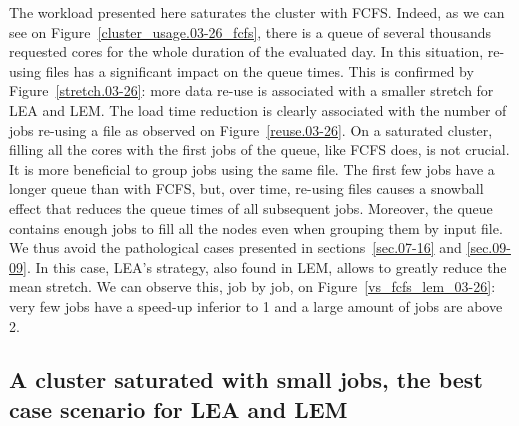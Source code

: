 \documentclass[conference,10pt]{IEEEtran}
\begin{document}
The workload presented here saturates the cluster with FCFS. 
Indeed, as we can see on Figure~\ref{cluster_usage.03-26_fcfs}, there is
a queue of several thousands requested cores
for the whole duration of the evaluated day.
In this situation, re-using files has a significant impact
on the queue times. This is confirmed by Figure~\ref{stretch.03-26}:
more data re-use is associated with a smaller stretch for LEA and LEM.
The load time reduction is clearly associated with the number of jobs re-using a file
as observed on Figure~\ref{reuse.03-26}.
On a saturated cluster, filling all the cores with the first jobs of the queue, like FCFS does, is not crucial.
It is more beneficial to group jobs using the same file.
The first few jobs have a longer queue than with FCFS,
but, over time, re-using files causes a snowball effect that reduces the 
queue times of all subsequent jobs.
Moreover, the queue contains enough jobs to fill all the nodes even when grouping them by input file.
We thus avoid the pathological cases presented in sections~\ref{sec.07-16} and \ref{sec.09-09}.
In this case, LEA's strategy, also found in LEM, allows to greatly reduce the mean stretch.
We can observe this, job by job, on Figure~\ref{vs_fcfs_lem_03-26}: very few jobs 
have a speed-up inferior to 1 and a large amount of jobs are above 2. 

\subsection{A cluster saturated with small jobs, the best case scenario for LEA and LEM}\label{sec.08-16}
\end{document}
